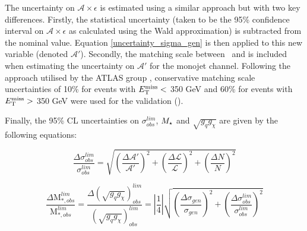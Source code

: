 
The uncertainty on $\mathcal{A} \times \epsilon$ is estimated using a similar approach but with two key differences. Firstly, the statistical uncertainty (taken to be the 95\% confidence interval on $\mathcal{A}\times\epsilon$ as calculated using the Wald approximation) is subtracted from the nominal value. Equation \ref{uncertainty_sigma_gen} is then applied to this new variable (denoted $\mathcal{A}'$). Secondly, the matching scale between \MG\mbox{ }and \PYTHIA is included when estimating the uncertainty on $\mathcal{A}'$ for the monojet channel. Following the approach utilised by the ATLAS group \cite{CERN-THESIS-2015-038}, conservative matching scale uncertainties of 10\% for events with $E_{\mathrm{T}}^{\mathrm{miss}} <$ 350 GeV and 60\% for events with $E_{\mathrm{T}}^{\mathrm{miss}} >$ 350 GeV were used for the validation ().
 

Finally, the 95\% CL uncertainties on $\sigma_{obs}^{lim}$, $M_{\star}$ and $\sqrt{g_q g_{\chi}}$ are given by the following equations:

\begin{equation}
\label{uncertainty_sigma_lim}
\frac{\Delta \sigma_{obs}^{lim}}{\sigma_{obs}^{lim}} = \sqrt{\left(\frac{\Delta \mathcal{A}'}{\mathcal{A}'}\right)^{2} + \left(\frac{\Delta \mathcal{L}}{\mathcal{L}}\right)^{2} + \left(\frac{\Delta N}{N}\right)^{2}}
\end{equation}

\begin{equation}
\label{uncertainty_M_star}
\frac{\Delta \mbox{M}_{*,obs}^{lim}}{\mbox{M}_{*,obs}^{lim}} = \frac{\Delta (\sqrt{g_{q}g_{\chi}})_{obs}^{lim}}{(\sqrt{g_{q}g_{\chi}})_{obs}^{lim}} = \left|\frac{1}{4}\right|\sqrt{\left(\frac{\Delta \sigma_{gen}}{\sigma_{gen}}\right)^{2} + \left(\frac{\Delta \sigma_{obs}^{lim}}{\sigma_{obs}^{lim}}\right)^{2}}
\end{equation}

